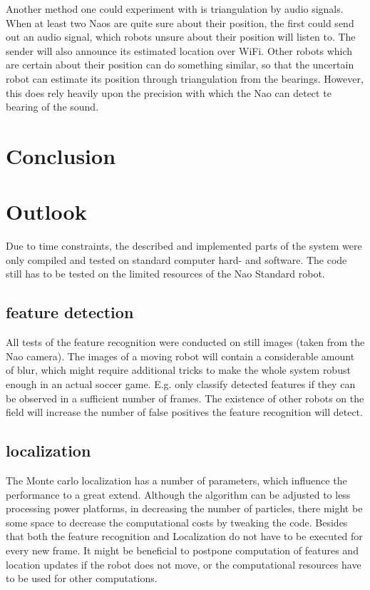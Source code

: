 \documentclass[	DIV=calc,%
							paper=a4,%
							fontsize=9pt,%
							twocolumn]{scrartcl}	 					%
\begin{document}
Another method one could experiment with is triangulation by audio signals.  When at least two Naos are quite sure about their position, the first could send out an audio signal, which robots unsure about their position will listen to.  The sender will also announce its estimated location over WiFi. Other robots which are certain about their position can do something similar, so that the uncertain robot can estimate its position through triangulation from the bearings.  However, this does rely heavily upon the precision with which the Nao can detect te bearing of the sound.


\section{Conclusion}
\label{sec:Conclusion}

\section{Outlook}
Due to time constraints, the described and implemented parts of the system were only compiled and tested on standard computer hard- and software. The code still has to be tested on the limited resources of the Nao Standard robot.
\subsection{feature detection}
All tests of the feature recognition were conducted on still images (taken from the Nao camera). The images of a moving robot will contain a considerable amount of blur, which might require additional tricks to make the whole system robust enough in an actual soccer game. E.g. only classify detected features if they can be observed in a sufficient number of frames.
The existence of other robots on the field will increase the number of false positives the feature recognition will detect.
\subsection{localization}
The Monte carlo localization has a number of parameters, which influence the performance to a great extend.
Although the algorithm can be adjusted to less processing power platforms, in decreasing the number of particles, there might be some space to decrease the computational costs by tweaking the code.
Besides that both the feature recognition and Localization do not have to be executed for every new frame. It might be beneficial to postpone computation of features and location updates if the robot does not move, or the computational resources have to be used for other computations.

\printbibliography
\end{document}
